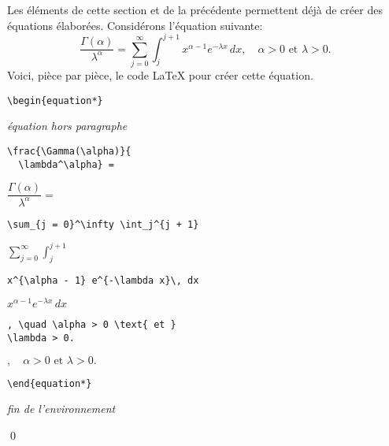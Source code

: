 \begin{exemple}
  Les éléments de cette section et de la précédente permettent déjà de
  créer des équations élaborées. Considérons l'équation suivante:
  \begin{equation*}
    \frac{\Gamma(\alpha)}{\lambda^\alpha} =
    \sum_{j = 0}^\infty \int_j^{j + 1} x^{\alpha - 1} e^{-\lambda x}\,
    dx,
    \quad
    \alpha > 0 \text{ et } \lambda > 0.
  \end{equation*}
  Voici, pièce par pièce, le code {\LaTeX} pour créer cette équation.
  \begin{demo}
    \begin{texample}[0.58\linewidth]
\begin{lstlisting}
\begin{equation*}
\end{lstlisting}
      \producing
      \emph{équation hors paragraphe}
    \end{texample}

    \begin{texample}[0.58\linewidth]
\begin{lstlisting}
\frac{\Gamma(\alpha)}{
  \lambda^\alpha} =
\end{lstlisting}
      \producing
      $\dfrac{\Gamma(\alpha)}{\lambda^\alpha} =$
    \end{texample}

    \begin{texample}[0.58\linewidth]
\begin{lstlisting}
\sum_{j = 0}^\infty \int_j^{j + 1}
\end{lstlisting}
      \producing
      $\displaystyle \sum_{j = 0}^\infty \int_j^{j + 1}$
    \end{texample}

    \begin{texample}[0.58\linewidth]
\begin{lstlisting}
x^{\alpha - 1} e^{-\lambda x}\, dx
\end{lstlisting}
      \producing
      $\displaystyle x^{\alpha - 1} e^{-\lambda x}\, dx$
    \end{texample}

    \begin{texample}[0.58\linewidth]
\begin{lstlisting}
, \quad \alpha > 0 \text{ et }
\lambda > 0.
\end{lstlisting}
      \producing
      $, \quad \alpha > 0 \text{ et } \lambda > 0.$
    \end{texample}

    \begin{texample}[0.58\linewidth]
\begin{lstlisting}
\end{equation*}
\end{lstlisting}
      \producing
      \emph{fin de l'environnement}
    \end{texample}
  \end{demo}
  \qed
\end{exemple}


